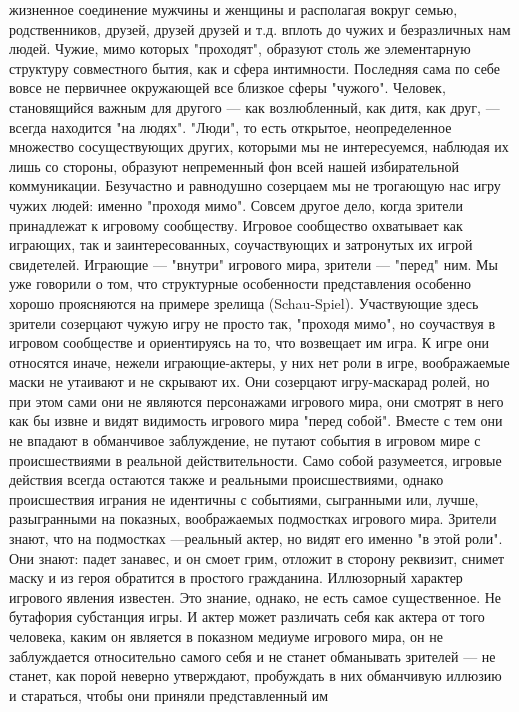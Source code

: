 \documentclass[12pt]{article}
\begin{document}
жизненное соединение мужчины и женщины и располагая вокруг семью, родственников, друзей, друзей друзей
и т.д.  вплоть  до чужих и безразличных нам  людей.  Чужие,  мимо которых "проходят", образуют  столь же
элементарную  структуру  совместного  бытия,  как  и  сфера  интимности.  Последняя  сама  по  себе  вовсе  не
первичнее  окружающей  все  близкое  сферы  "чужого".  Человек,  становящийся  важным  для  другого  ---  как
возлюбленный, как дитя, как друг, --- всегда находится "на людях". "Люди", то есть открытое, неопределенное
множество сосуществующих других, которыми мы не интересуемся, наблюдая их лишь со стороны, образуют
непременный  фон  всей  нашей  избирательной  коммуникации.  Безучастно  и  равнодушно  созерцаем  мы  не
трогающую нас игру чужих людей: именно "проходя мимо".
Совсем другое дело, когда зрители принадлежат к игровому сообществу. Игровое сообщество охватывает как
играющих, так и заинтересованных, соучаствующих и затронутых их игрой свидетелей. Играющие --- "внутри"
игрового мира, зрители --- "перед" ним. Мы уже говорили о том, что структурные особенности представления
особенно  хорошо  проясняются  на  примере  зрелища  (Schau-Spiel).  Участвующие  здесь  зрители  созерцают
чужую игру не просто так, "проходя мимо", но соучаствуя в игровом сообществе и ориентируясь на то, что
возвещает им игра. К игре они относятся иначе, нежели играющие-актеры, у них нет роли в игре, воображаемые
маски не утаивают и не скрывают их. Они созерцают игру-маскарад ролей, но при этом сами они не являются
персонажами игрового мира, они смотрят в него как бы извне и видят видимость игрового мира "перед собой".
Вместе с тем они не впадают в обманчивое заблуждение, не путают события в игровом мире с происшествиями
в реальной действительности. Само собой разумеется, игровые действия всегда остаются также и реальными
происшествиями,  однако  происшествия  играния  не  идентичны  с  событиями,  сыгранными  или,  лучше,
разыгранными на показных, воображаемых подмостках игрового мира. Зрители знают, что на подмостках ---реальный актер, но видят его именно "в этой роли". Они знают: падет занавес, и он смоет грим, отложит в
сторону реквизит, снимет маску и из героя обратится в простого гражданина. Иллюзорный характер игрового
явления известен. Это знание, однако, не есть самое существенное. Не бутафория субстанция игры. И актер
может различать себя как актера от того человека, каким он является в показном медиуме игрового мира, он не
заблуждается относительно самого себя и не станет обманывать зрителей --- не станет, как порой неверно
утверждают, пробуждать в них обманчивую иллюзию и стараться, чтобы они приняли представленный им
\end{document}

